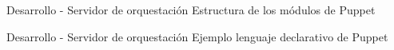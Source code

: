 \begin{frame}{Desarrollo - Servidor de orquestación}
    \vspace{0cm} {Estructura de los módulos de Puppet}
    \vspace{0cm}
    \begin{figure}[ht]
       \centering
    \end{figure}

\end{frame}

\begin{frame}{Desarrollo - Servidor de orquestación}
    \vspace{0cm} {Ejemplo lenguaje declarativo de Puppet}
    \vspace{0cm}
    \begin{figure}[ht]
       \centering
    \end{figure}

\end{frame}

